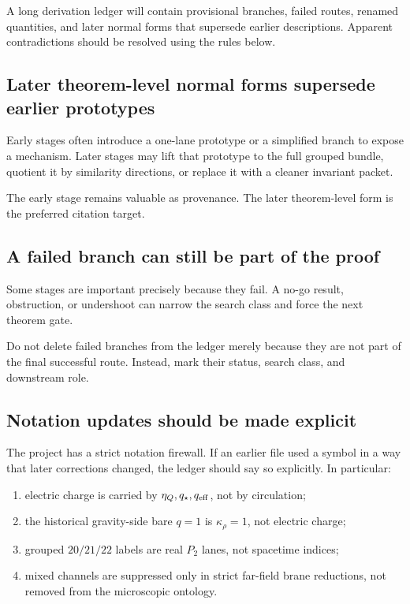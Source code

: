 A long derivation ledger will contain provisional branches, failed routes, renamed quantities, and later normal forms that supersede earlier descriptions.  Apparent contradictions should be resolved using the rules below.

\subsection{Later theorem-level normal forms supersede earlier prototypes}
\label{subsec:later-normal-forms}

Early stages often introduce a one-lane prototype or a simplified branch to expose a mechanism.  Later stages may lift that prototype to the full grouped bundle, quotient it by similarity directions, or replace it with a cleaner invariant packet.

The early stage remains valuable as provenance.  The later theorem-level form is the preferred citation target.

\subsection{A failed branch can still be part of the proof}
\label{subsec:failed-branch-proof}

Some stages are important precisely because they fail.  A no-go result, obstruction, or undershoot can narrow the search class and force the next theorem gate.

Do not delete failed branches from the ledger merely because they are not part of the final successful route.  Instead, mark their status, search class, and downstream role.

\subsection{Notation updates should be made explicit}
\label{subsec:notation-updates}

The project has a strict notation firewall.  If an earlier file used a symbol in a way that later corrections changed, the ledger should say so explicitly.  In particular:
\begin{enumerate}[leftmargin=2.2em]
  \item electric charge is carried by \(\eta_Q,q_\star,q_{\rm eff}\), not by circulation;
  \item the historical gravity-side bare \(q=1\) is \(\kappa_\rho=1\), not electric charge;
  \item grouped \(20/21/22\) labels are real \(P_2\) lanes, not spacetime indices;
  \item mixed channels are suppressed only in strict far-field brane reductions, not removed from the microscopic ontology.
\end{enumerate}

